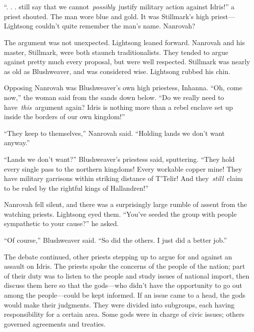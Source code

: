 \chapter{}

“. . . still say that we cannot~\textit{possibly}~justify military action against Idris!” a priest shouted. The man wore blue and gold. It was Stillmark’s high priest—Lightsong couldn’t quite remember the man’s name. Nanrovah?

The argument was not unexpected. Lightsong leaned forward. Nanrovah and his master, Stillmark, were both staunch traditionalists. They tended to argue against pretty much every proposal, but were well respected. Stillmark was nearly as old as Blushweaver, and was considered wise. Lightsong rubbed his chin.

Opposing Nanrovah was Blushweaver’s own high priestess, Inhanna. “Oh, come now,” the woman said from the sands down below. “Do we really need to have~\textit{this}~argument again? Idris is nothing more than a rebel enclave set up inside the borders of our own kingdom!”

“They keep to themselves,” Nanrovah said. “Holding lands we don’t want anyway.”

“Lands we don’t want?” Blushweaver’s priestess said, sputtering. “They hold every single pass to the northern kingdoms! Every workable copper mine! They have military garrisons within striking distance of T’Telir! And they~\textit{still}~claim to be ruled by the rightful kings of Hallandren!”

Nanrovah fell silent, and there was a surprisingly large rumble of assent from the watching priests. Lightsong eyed them. “You’ve seeded the group with people sympathetic to your cause?” he asked.

“Of course,” Blushweaver said. “So did the others. I just did a better job.”

The debate continued, other priests stepping up to argue for and against an assault on Idris. The priests spoke the concerns of the people of the nation; part of their duty was to listen to the people and study issues of national import, then discuss them here so that the gods—who didn’t have the opportunity to go out among the people—could be kept informed. If an issue came to a head, the gods would make their judgments. They were divided into subgroups, each having responsibility for a certain area. Some gods were in charge of civic issues; others governed agreements and treaties.

